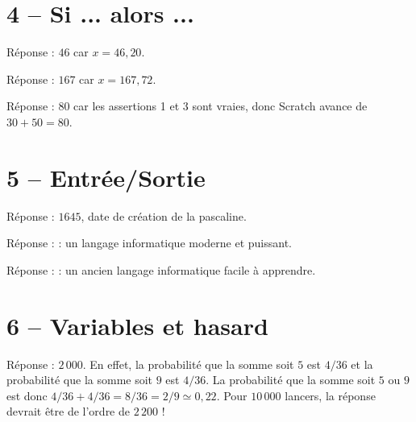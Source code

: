 \documentclass[class=report,crop=false, 12pt]{standalone}
\begin{document}
\section*{4 -- Si ... alors ...}

\setcounter{enigme}{0}

\begin{enigme}
Réponse : $46$ car $x=46,20$.
\end{enigme}

\begin{enigme}
Réponse : $167$ car $x=167,72$.
\end{enigme}

\begin{enigme}
Réponse : $80$ car les assertions 1 et 3 sont vraies, donc Scratch avance de $30+50=80$.
\end{enigme}


\section*{5 -- Entrée/Sortie}

\setcounter{enigme}{0}

\begin{enigme}
Réponse : $1645$, date de création de la pascaline.
\end{enigme}

\begin{enigme}
Réponse : \og {} \fg{} : un langage informatique moderne et puissant.
\end{enigme}

\begin{enigme}
Réponse : \og {} \fg{} : un ancien langage informatique facile à apprendre.
\end{enigme}


\section*{6 -- Variables et hasard}

\setcounter{enigme}{0}

\begin{enigme}
Réponse : $2\, 000$. En effet, la probabilité que la somme soit $5$ est $4/36$ et la probabilité que la somme soit $9$ est $4/36$.
La probabilité que la somme soit $5$ ou $9$ est donc $4/36 + 4/36 = 8/36 = 2/9 \simeq 0,22$.
Pour $10 \, 000$ lancers, la réponse devrait être de l'ordre de $2\, 200$ !
\end{enigme}
\end{document}
